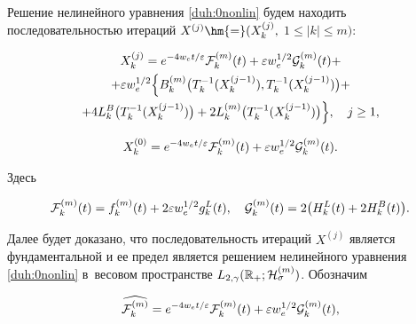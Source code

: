 \smallskip




Решение нелинейного уравнения \eqref{duh:0nonlin} будем находить последовательностью итераций $X^{(j)}\hm{=}(X^{(j)}_k,$ $1\le |k|\le m)$:

\begin{multline}

X^{(j)}_k=e^{-4w_e t/\varepsilon} {\cal F}^{(m)}_k(t) 

+\varepsilon w_e^{1/2} {\cal G}^{(m)}_k(t) +\\

+\varepsilon w_e^{1/2}

\Bigl\{ 

B^{(m)}_k 

\bigl(T^{-1}_k(X^{(j-1)}_k),  T^{-1}_k(X^{(j-1)}_k)\bigr)+

\\

+

4 L_k^B

\bigl(T^{-1}_k(X^{(j-1)}_k)\bigr)+

2L^{(m)}_k \bigl(T^{-1}_k(X^{(j-1)}_k) \bigr)\Bigr\},\quad j\ge1,

\label{duh:nonlinj}

\end{multline}

$$X^{(0)}_k=e^{-4w_e t/\varepsilon} {\cal F}^{(m)}_k(t)

+\varepsilon w_e^{1/2}{\cal G}^{(m)}_k(t).$$

Здесь

\begin{gather*}

{\cal F}^{(m)}_k(t)=f^{(m)}_k(t)+2\varepsilon w_e^{1/2} g^L_k(t),

\quad 

{\cal G}^{(m)}_k(t)=2\bigl(H^L_k(t)+2H^B_k(t)\bigr).

\end{gather*}

Далее будет доказано, что последовательность итераций $X^{(j)}$ является фундаментальной и ее предел является решением нелинейного уравнения  \eqref{duh:0nonlin} в~весовом пространстве $L_{2,\gamma}(\mathbb R_{+};{\cal H}^{(m)}_\sigma)$. Обозначим 

$$

\widehat{{\cal F}^{(m)}_k}=e^{-4w_e t/\varepsilon} {\cal F}^{(m)}_k(t)

+\varepsilon w_e^{1/2} {\cal G}^{(m)}_k(t),$$ 

